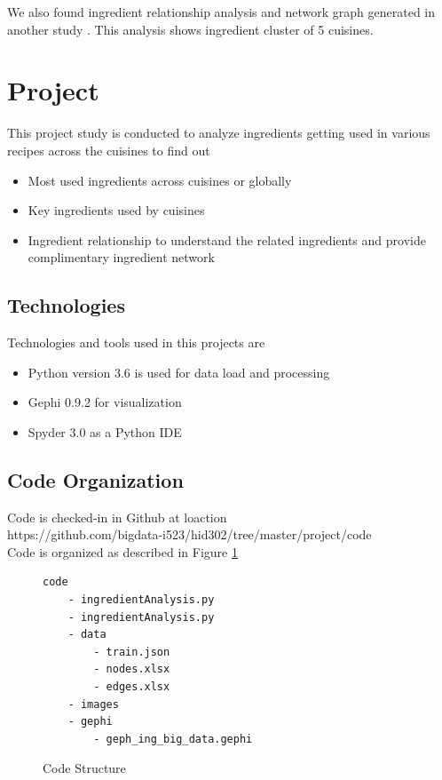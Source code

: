 \documentclass[sigconf]{acmart}
\begin{document}
We also found ingredient relationship analysis and network graph generated in another study \cite{foodgraph}. This analysis shows ingredient cluster of 5 cuisines.

\section{Project}
This project study is conducted to analyze ingredients getting used in various recipes across the cuisines to find out
\begin{itemize}
\item Most used ingredients across cuisines or globally
\item Key ingredients used by cuisines
\item Ingredient relationship to understand the related ingredients and provide complimentary ingredient network
\end{itemize}

\subsection{Technologies}
Technologies and tools used in this projects are
\begin{itemize}
\item Python version 3.6 is used for data load and processing
\item Gephi 0.9.2 for visualization
\item Spyder 3.0 as a Python IDE
\end{itemize}

\subsection{Code Organization}
Code is checked-in in Github at loaction \\
https://github.com/bigdata-i523/hid302/tree/master/project/code \\
Code is organized as described in Figure \ref{c:code-structure}
\begin{figure}[htb]
\begin{verbatim}
code
    - ingredientAnalysis.py
    - ingredientAnalysis.py
    - data
        - train.json
        - nodes.xlsx
        - edges.xlsx
    - images
    - gephi
        - geph_ing_big_data.gephi
\end{verbatim}
\caption{Code Structure}\label{c:code-structure}
\end{figure}
\end{document}
